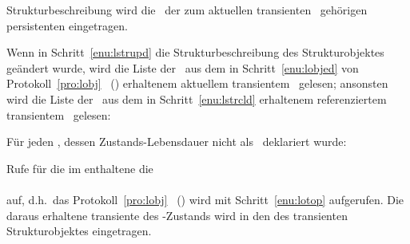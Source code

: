\begin{infol}
\begin{block}
Strukturbeschreibung wird die \objid\ der zum aktuellen transienten
\clsdo\ geh\"{o}rigen persistenten \representation{} eingetragen.
%
\end{block}%
%
\item Wenn in Schritt~\ref{enu:lstrupd} die Strukturbeschreibung des
Strukturobjektes ge\-\"{a}n\-dert wurde, wird die Liste der \sltdo[e]\ aus
dem in Schritt~\ref{enu:lobjed} von Protokoll~\ref{pro:lobj}
\ (\citepage{\pageref{enu:lobjed}}) erhaltenem
aktuellem transientem \clsdo\ gelesen; ansonsten wird die Liste der
\sltdo[e]\ aus dem in Schritt~\ref{enu:lstrcld} erhaltenem
referenziertem transientem \clsdo\ gelesen:\\ 
%
\item F\"{u}r jeden \Slt, dessen Zustands-Lebensdauer nicht als
\ deklariert wurde:
%
\begin{block}
%
\item Rufe f\"{u}r die im \Slt\/ enthaltene \sobjid\/ die \gfn\\
\\
auf, d.h.\ das Protokoll~\ref{pro:lobj}
\ (\citepage{\pageref{pro:lobj}}) wird mit
Schritt~\ref{enu:lotop} aufgerufen. Die daraus erhaltene transiente
\representation{} des \Slt\/-Zustands wird in den \Slt\/ des transienten
Strukturobjektes eingetragen.
%
\end{block}
%
\end{infol}
%
%
